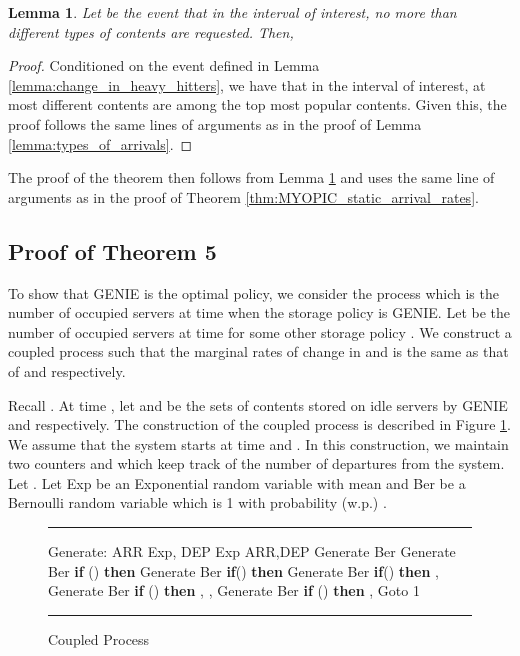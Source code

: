 \documentclass[10pt, conference, letterpaper]{IEEEtran}
\newtheorem{lemma}{Lemma}
\begin{document}
\begin{lemma}
	\label{lemma:types_of_arrivals_changing_arrival_rates}
	Let  be the event that in the interval of interest, no more than  different types of contents are requested. Then,
	
\end{lemma}
\begin{proof}
	Conditioned on the event  defined in Lemma \ref{lemma:change_in_heavy_hitters}, we have that in the interval of interest, at most  different contents are among the top  most popular contents. Given this, the proof follows the same lines of arguments as in the proof of Lemma \ref{lemma:types_of_arrivals}.
\end{proof}
The proof of the theorem then follows from Lemma \ref{lemma:types_of_arrivals_changing_arrival_rates} and uses the same line of arguments as in the proof of Theorem \ref{thm:MYOPIC_static_arrival_rates}.





\subsection{Proof of Theorem 5}
\label{sec:proof1}

To show that GENIE is the optimal policy, we consider the process  which is the number of occupied servers at time  when the storage policy is GENIE. Let  be the number of occupied servers at time  for some other storage policy . We construct a coupled process  such that the marginal rates of change in  and  is the same as that of  and  respectively.

Recall . At time , let  and  be the sets of contents stored on idle servers by GENIE and  respectively. The construction of the coupled process  is described in Figure \ref{fig:coupling}. We assume that the system starts at time  and . In this construction, we maintain two counters  and  which keep track of the number of departures from the system. Let . Let Exp be an Exponential random variable with mean  and Ber be a Bernoulli random variable which is 1 with probability (w.p.) .

\begin{figure}[h]
	\hrule
	\vspace{0.1in}
	\begin{algorithmic}[1]
		\STATE Generate: ARR  Exp, DEP  Exp
		\STATE ARR,DEP
		\IF {()}
		\STATE Generate  Ber
		\IF {()}
		\STATE 
		\STATE Generate  Ber
		\STATE \textbf{if} () \textbf{then} 
		\ENDIF
		\ELSE
		\STATE Generate  Ber
		\STATE \textbf{if}() \textbf{then} 
		\STATE Generate  Ber
		\STATE \textbf{if}() \textbf{then} 
		\ENDIF
		\ELSE
		\IF{()}
		\STATE , 
		\STATE Generate  Ber
		\STATE \textbf{if} () \textbf{then} , 
		\ELSE
		\STATE , 
		\STATE Generate  Ber
		\STATE \textbf{if} () \textbf{then} , 
		\ENDIF
		\ENDIF
		\STATE Goto 1
	\end{algorithmic}
	\vspace{0.1in}
	\hrule
	\caption{Coupled Process}
	\label{fig:coupling}
\end{figure}
\end{document}
